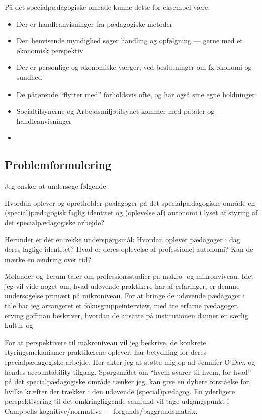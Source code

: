 På det specialpædagogiske område kunne dette for eksempel være:
\begin{itemize}
  \item
    Der er handleanvisninger fra pædagogiske metoder
  \item
    Den henvisende myndighed søger handling og opfølgning — gerne med et økonomisk perspektiv
  \item
    Der er personlige og økonomiske værger, ved beslutninger om fx økonomi og sundhed
  \item
    De pårørende “flytter med” forholdsvis ofte, og har også sine egne holdninger
  \item
    Socialtilsynerne og Arbejdsmiljøtilsynet kommer med påtaler og handleanvisninger
  \item
\end{itemize}

\subsection{Problemformulering}
Jeg ønsker at undersøge følgende:

Hvordan oplever og opretholder pædagoger på det specialpædagogiske område en (special)pædagogisk faglig identitet og (oplevelse af) autonomi i lyset af styring af det specialpædagogiske arbejde?

Herunder er der en rekke underspørgsmål:
Hvordan oplever pædagoger i dag deres faglige identitet?
Hvad er deres oplevelse af professionel autonomi?
Kan de mærke en ændring over tid?

Molander og Terum taler om professionsstudier på makro- og mikronviveau. 
Idet jeg vil vide noget om, hvad udøvende praktikere har af erfaringer, er dennne undersøgelse primært på mikroniveau.
For at bringe de udøvende pædagoger i tale har jeg arrangeret et fokusgruppeinterview, med tre erfarne pædagoger.
erving goffman beskriver, hvordan de ansatte på institutionen danner en særlig kultur og 

For at perspektivere til makroniveau vil jeg beskrive, de konkrete styringsmekanismer praktikerene oplever, har betydning for deres specialpædagogiske arbejde.
Her akter jeg at støtte mig op ad Jennifer O'Day, og hendes accountability-tilgang.
Spørgsmålet om “hvem svarer til hvem, for hvad” på det specialpædagogiske område tænker jeg, kan give en dybere forståelse for, hvilke kræfter der trækker i den udøvende (special)pædagog.
En yderligere perspektivering til det omkringliggende samfund 
vil tage udgangspunkt i Campbells kognitive/normative — forgunds/baggrundsmatrix.

